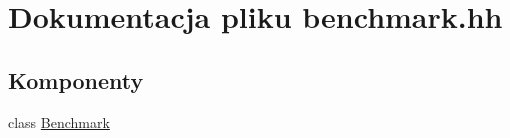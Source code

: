 \hypertarget{benchmark_8hh}{\section{\-Dokumentacja pliku benchmark.\-hh}
\label{benchmark_8hh}
}
\subsection*{\-Komponenty}
\begin{DoxyCompactItemize}
\item 
class \hyperlink{class_benchmark}{\-Benchmark}
\end{DoxyCompactItemize}
